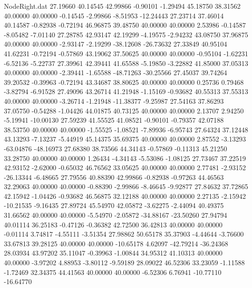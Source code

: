 \begin{filecontents}{NodeRight.dat}
  27.19660   40.14545   42.99866    -0.90101   -1.29494   45.18750   38.31562   40.00000   40.00000   -0.14545   -2.99866   -8.51953  -12.24443
  27.23714   37.46014   40.14587    -0.82938   -0.72194   46.96875   39.48750   40.00000   40.00000    2.53986   -0.14587   -8.05482   -7.01140
  27.28785   42.93147   42.19299    -4.19575   -2.94232   43.08750   37.96875   40.00000   40.00000   -2.93147   -2.19299  -38.12608  -26.73632
  27.33849   40.95104   41.62231    -0.72194   -0.57869   43.19062   37.50625   40.00000   40.00000   -0.95104   -1.62231   -6.52136   -5.22737
  27.39961   42.39441   41.65588    -5.19850   -3.22882   41.85000   37.05313   40.00000   40.00000   -2.39441   -1.65588  -48.71263  -30.25566
  27.45037   39.74264   39.20532    -0.39963   -0.72194   43.34687   38.80625   40.00000   40.00000    0.25736    0.79468   -3.82794   -6.91528
  27.49096   43.26714   41.21948    -1.15169   -0.93682   40.55313   37.55313   40.00000   40.00000   -3.26714   -1.21948  -11.38377   -9.25987
  27.54163   37.86293   37.05750    -0.54288   -1.04426   44.01875   40.73125   40.00000   40.00000    2.13707    2.94250   -5.19941  -10.00130
  27.59239   41.55525   41.08521    -0.90101   -0.79357   42.07188   38.53750   40.00000   40.00000   -1.55525   -1.08521   -7.89936   -6.95743
  27.64324   37.12448   43.13293    -7.13237   -5.44919   45.14375   35.69375   40.00000   40.00000    2.87552   -3.13293  -63.04876  -48.16973
  27.68380   38.73566   44.34143    -0.57869   -0.11313   45.21250   33.28750   40.00000   40.00000    1.26434   -4.34143   -5.53086   -1.08125
  27.73467   37.22519   42.93152    -2.62000   -0.65032   46.76562   33.05625   40.00000   40.00000    2.77481   -2.93152  -26.13344   -6.48665
  27.79556   40.88390   42.99866    -0.82938   -0.97263   44.46563   32.29063   40.00000   40.00000   -0.88390   -2.99866   -8.46645   -9.92877
  27.84632   37.72865   42.15942    -1.04426   -0.93682   46.56875   32.12188   40.00000   40.00000    2.27135   -2.15942  -10.21535   -9.16435
  27.89724   45.54970   42.05872    -3.62275   -2.44094   40.49375   31.66562   40.00000   40.00000   -5.54970   -2.05872  -34.88167  -23.50260
  27.94794   40.01114   36.25183    -0.47126   -0.36382   42.72500   36.42813   40.00000   40.00000   -0.01114    3.74817   -4.55111   -3.51354
  27.98862   50.65178   35.37903    -4.44644   -3.76600   33.67813   39.28125   40.00000   40.00000  -10.65178    4.62097  -42.79214  -36.24368
  28.03934   43.97202   35.11047    -0.39963   -1.00844   34.95312   41.10313   40.00000   40.00000   -3.97202    4.88953   -3.80112   -9.59189
  28.09022   46.52306   33.23059    -1.11588   -1.72469   32.34375   44.41563   40.00000   40.00000   -6.52306    6.76941  -10.77110  -16.64770

\end{filecontents}
